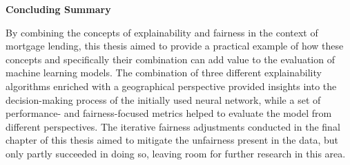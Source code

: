 \textbf{Concluding Summary}

By combining the concepts of explainability and fairness in the context of mortgage lending, this thesis aimed to provide a practical example of how these concepts and specifically their combination can add value to the evaluation of machine learning models.
The combination of three different explainability algorithms enriched with a geographical perspective provided insights into the decision-making process of the initially used neural network, while a set of performance- and fairness-focused metrics helped to evaluate the model from different perspectives.
The iterative fairness adjustments conducted in the final chapter of this thesis aimed to mitigate the unfairness present in the data, but only partly succeeded in doing so, leaving room for further research in this area.